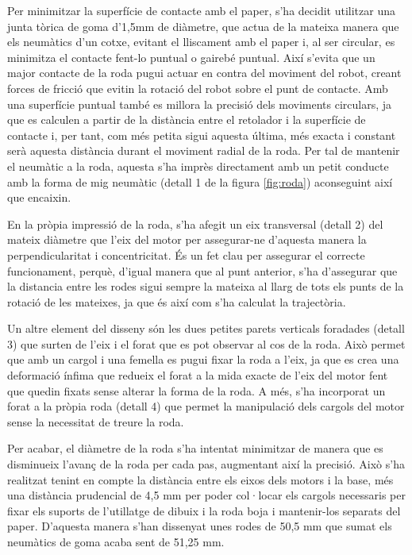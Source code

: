 Per minimitzar la superfície de contacte amb el paper, s’ha decidit utilitzar una junta tòrica de goma d’1,5mm de diàmetre, que actua de la mateixa manera que els neumàtics d’un cotxe, evitant el lliscament amb el paper i, al ser circular, es minimitza el contacte fent-lo puntual o gairebé puntual. Així s’evita que un major contacte de la roda pugui actuar en contra del moviment del robot, creant forces de fricció que evitin la rotació del robot sobre el punt de contacte. Amb una superfície puntual també es millora la precisió dels moviments circulars, ja que es calculen a partir de la distància entre el retolador i la superfície de contacte i, per tant, com més petita sigui aquesta última, més exacta i constant serà aquesta distància durant el moviment radial de la roda. Per tal de mantenir el neumàtic a la roda, aquesta s’ha imprès directament amb un petit conducte amb la forma de mig neumàtic (detall 1 de la figura \ref{fig:roda}) aconseguint així que encaixin. 

En la pròpia impressió de la roda, s’ha afegit un eix transversal (detall 2) del mateix diàmetre que l’eix del motor per assegurar-ne d’aquesta manera la perpendicularitat i concentricitat. És un fet clau per assegurar el correcte funcionament, perquè, d’igual manera que al punt anterior, s’ha d’assegurar que la distancia entre les rodes sigui sempre la mateixa al llarg de tots els punts de la rotació de les mateixes, ja que és així com s’ha calculat la trajectòria. 

Un altre element del disseny són les dues petites parets verticals foradades (detall 3) que surten de l’eix i el forat que es pot observar al cos de la roda. Això permet que amb un cargol i una femella es pugui fixar la roda a l'eix, ja que es crea una deformació ínfima que redueix el forat a la mida exacte de l'eix del motor fent que quedin fixats sense alterar la forma de la roda. A  més, s'ha incorporat un forat a la pròpia roda (detall 4) que permet la manipulació dels cargols del motor sense la necessitat de treure la roda. 

Per acabar, el diàmetre de la roda s’ha intentat minimitzar de manera que es disminueix l’avanç de la roda per cada pas, augmentant així la precisió. Això s’ha realitzat tenint en compte la distància entre els eixos dels motors i la base, més una distància prudencial de 4,5 mm per poder col·locar els cargols necessaris per fixar els suports de l’utillatge de dibuix i la roda boja i mantenir-los separats del paper. D’aquesta manera s’han dissenyat unes rodes de 50,5 mm que sumat els neumàtics de goma acaba sent de 51,25 mm. 

